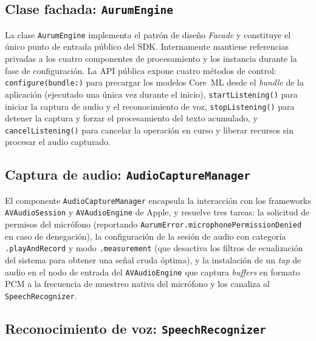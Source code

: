 \subsection{Clase fachada: \texttt{Aurum\allowbreak{}Engine}}

La clase \texttt{Aurum\allowbreak{}Engine} implementa el patrón de diseño \textit{Facade} \citep{gamma1994design} y constituye el único punto de entrada público del SDK. Internamente mantiene referencias privadas a los cuatro componentes de procesamiento y los instancia durante la fase de configuración. La API pública expone cuatro métodos de control:
\texttt{configure\allowbreak{}(bundle:)} para precargar los modelos Core~ML desde el \textit{bundle} de la aplicación (ejecutado una única vez durante el inicio),
\texttt{start\allowbreak{}Listen\-ing()} para iniciar la captura de audio y el reconocimiento de voz,
\texttt{stop\allowbreak{}Listen\-ing()} para detener la captura y forzar el procesamiento del texto acumulado, y
\texttt{cancel\allowbreak{}Listen\-ing()} para cancelar la operación en curso y liberar recursos sin procesar el audio capturado.

\subsection{Captura de audio: \texttt{Audio\allowbreak{}Capture\allowbreak{}Manager}}

El componente \texttt{Audio\allowbreak{}Capture\allowbreak{}Manager} encapsula la interacción con los frameworks \texttt{AV\allowbreak{}Audio\allowbreak{}Session} y \texttt{AV\allowbreak{}Audio\allowbreak{}Engine} de Apple, y resuelve tres tareas: la solicitud de permisos del micrófono (reportando \texttt{AurumError.\allowbreak{}microphone\allowbreak{}Permission\allowbreak{}Denied} en caso de denegación), la configuración de la sesión de audio con categoría \texttt{.playAndRecord} y modo \texttt{.measurement} (que desactiva los filtros de ecualización del sistema para obtener una señal cruda óptima), y la instalación de un \textit{tap} de audio en el nodo de entrada del \texttt{AV\allowbreak{}Audio\allowbreak{}Engine} que captura \textit{buffers} en formato PCM a la frecuencia de muestreo nativa del micrófono y los canaliza al \texttt{Speech\allowbreak{}Recognizer}.

\subsection{Reconocimiento de voz: \texttt{Speech\allowbreak{}Recognizer}}

